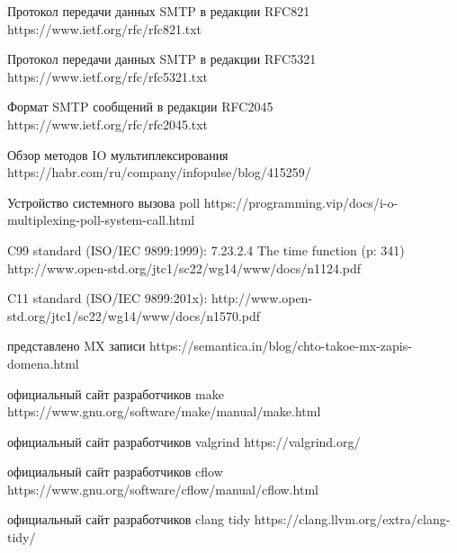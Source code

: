 \documentclass[a4paper,12pt]{report}
\begin{document}
  \newpage
    \begin{thebibliography}{11} 
    
     Протокол передачи данных SMTP в редакции RFC821 https://www.ietf.org/rfc/rfc821.txt
    
     Протокол передачи данных SMTP в редакции RFC5321 https://www.ietf.org/rfc/rfc5321.txt
    
       Формат SMTP сообщений в редакции RFC2045 https://www.ietf.org/rfc/rfc2045.txt
    
     Обзор методов IO мультиплексирования https://habr.com/ru/company/infopulse/blog/415259/
    
     Устройство системного вызова poll https://programming.vip/docs/i-o-multiplexing-poll-system-call.html
    
      C99 standard (ISO/IEC 9899:1999): 7.23.2.4 The time function (p: 341) 
     \\http://www.open-std.org/jtc1/sc22/wg14/www/docs/n1124.pdf
     
      C11 standard (ISO/IEC 9899:201x): http://www.open-std.org/jtc1/sc22/wg14/www/docs/n1570.pdf
     
       представлено MX записи https://semantica.in/blog/chto-takoe-mx-zapis-domena.html
      
      официальный сайт разработчиков make   https://www.gnu.org/software/make/manual/make.html
    
      официальный сайт разработчиков valgrind https://valgrind.org/
    
      официальный сайт разработчиков cflow  https://www.gnu.org/software/cflow/manual/cflow.html
     
       официальный сайт разработчиков clang tidy   https://clang.llvm.org/extra/clang-tidy/
    
    \end{thebibliography}
\end{document}

